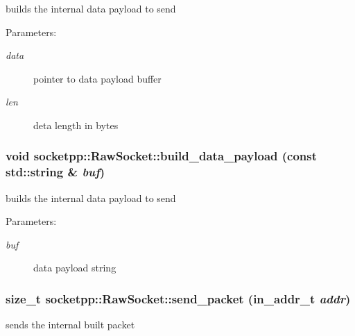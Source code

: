builds the internal data payload to send 

\begin{Desc}
\item[Parameters:]
\begin{description}
\item[{\em data}]pointer to data payload buffer \item[{\em len}]deta length in bytes \end{description}
\end{Desc}
\hypertarget{classsocketpp_1_1RawSocket_a5e01f4dec94dbbef1c122ce4d7ed4ad}{
\subsubsection{\setlength{\rightskip}{0pt plus 5cm}void socketpp::RawSocket::build\_\-data\_\-payload (const std::string \& {\em buf})}}
\label{classsocketpp_1_1RawSocket_a5e01f4dec94dbbef1c122ce4d7ed4ad}


builds the internal data payload to send 

\begin{Desc}
\item[Parameters:]
\begin{description}
\item[{\em buf}]data payload string \end{description}
\end{Desc}
\hypertarget{classsocketpp_1_1RawSocket_5c812c1bf584f40c3fc6263a8014395b}{
\subsubsection{\setlength{\rightskip}{0pt plus 5cm}size\_\-t socketpp::RawSocket::send\_\-packet (in\_\-addr\_\-t {\em addr})}}
\label{classsocketpp_1_1RawSocket_5c812c1bf584f40c3fc6263a8014395b}


sends the internal built packet 

